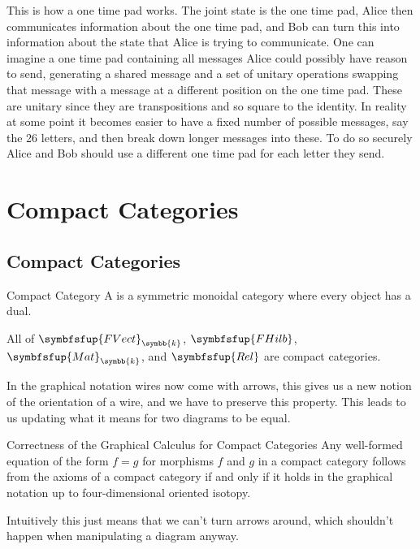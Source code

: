 \documentclass[fleqn]{NotesClass}
\makeatletter
\newcommand{\c@egory}[1]{\symbfsfup{#1}}
\newcommand{\Rel}{\c@egory{Rel}}
\renewcommand{\field}{\symbb{k}}
\newcommand{\Mat}[1][\field]{{\c@egory{Mat}_{#1}}}
\newcommand{\FVect}[1][\field]{{\c@egory{FVect}_{#1}}}
\newcommand{\FHilb}{\c@egory{FHilb}}
\makeatother
\begin{document}
    This is how a one time pad works.
    The joint state is the one time pad, Alice then communicates information about the one time pad, and Bob can turn this into information about the state that Alice is trying to communicate.
    One can imagine a one time pad containing all messages Alice could possibly have reason to send, generating a shared message and a set of unitary operations swapping that message with a message at a different position on the one time pad.
    These are unitary since they are transpositions and so square to the identity.
    In reality at some point it becomes easier to have a fixed number of possible messages, say the 26 letters, and then break down longer messages into these.
    To do so securely Alice and Bob should use a different one time pad for each letter they send.
    
    
    \chapter{Compact Categories}
    \section{Compact Categories}
    \begin{dfn}{Compact Category}{}
        A  is a symmetric monoidal category where every object has a dual.
    \end{dfn}
    
    All of \(\FVect\), \(\FHilb\), \(\Mat\), and \(\Rel\) are compact categories.
    
    In the graphical notation wires now come with arrows, this gives us a new notion of the orientation of a wire, and we have to preserve this property.
    This leads to us updating what it means for two diagrams to be equal.
    
    \begin{thm}{Correctness of the Graphical Calculus for Compact Categories}{}
        Any well-formed equation of the form \(f = g\) for morphisms \(f\) and \(g\) in a compact category follows from the axioms of a compact category if and only if it holds in the graphical notation up to four-dimensional oriented isotopy.
    \end{thm}
    
    Intuitively this just means that we can't turn arrows around, which shouldn't happen when manipulating a diagram anyway.
    
\end{document}
